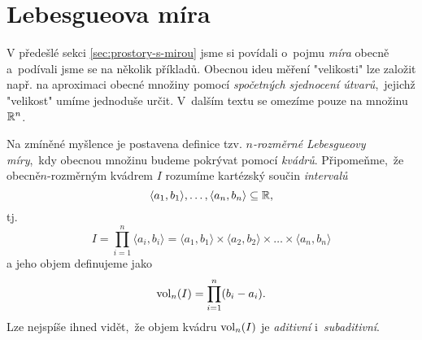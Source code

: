 \section{Lebesgueova míra}\label{sec:lebesgueova-mira}


V předešlé sekci \ref{sec:prostory-s-mirou} jsme si povídali o~pojmu \emph{míra} obecně a~podívali jsme se na několik příkladů. Obecnou ideu měření "velikosti" lze založit např. na aproximaci obecné množiny pomocí \emph{spočetných sjednocení útvarů},~jejichž "velikost" umíme jednoduše určit. V~dalším textu se omezíme pouze na množinu $\mathbb{R}^n$.

Na zmíněné myšlence je postavena definice tzv. \emph{$n$-rozměrné Lebesgueovy míry},~kdy obecnou množinu budeme pokrývat pomocí \emph{kvádrů}. Připomeňme,~že obecně\linebreak\mbox{$n$-rozměrným} kvádrem $I$ rozumíme kartézský součin \emph{intervalů}
\[\langle a_1,b_1\rangle,\ldots,\langle a_n,b_n\rangle\subseteq\mathbb{R},\]
tj.
\[I=\prod_{i=1}^{n}\langle a_i,b_i\rangle=\langle a_1,b_1\rangle\times\langle a_2,b_2\rangle\times\dots\times\langle a_n,b_n\rangle\]
a jeho objem definujeme jako
\[\operatorname{vol}_n(I)=\prod_{i=1}^{n}(b_i-a_i).\]
Lze nejspíše ihned vidět,~že objem kvádru $\operatorname{vol}_n(I)$ je \emph{aditivní} i~\textit{subaditivní}.


